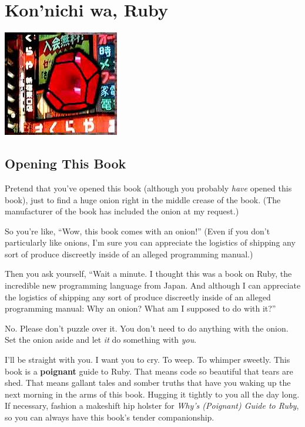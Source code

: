 \documentclass[10pt,twoside]{report}
\begin{document}
\newpage
\thispagestyle{empty}
\mbox{}
\cleartooddpage


\chapter{Kon'nichi wa, Ruby}
\vfill
\begin{center}
  \includegraphics{cache/chapterpoignantguide2.png}
\end{center}
\vspace{2cm}
\newpage
\thispagestyle{empty}
\mbox{}
\clearpage

\section{Opening This Book}

Pretend that you've opened this book (although you probably {\em have}
opened this book), just to find a huge onion right in the middle
crease of the book.  (The manufacturer of the book has included the
onion at my request.)

So you're like, ``Wow, this book comes with an onion!''  (Even if you
don't particularly like onions, I'm sure you can appreciate the
logistics of shipping any sort of produce discreetly inside of an
alleged programming manual.)

Then you ask yourself, ``Wait a minute.  I thought this was a book on
Ruby, the incredible new programming language from Japan.  And
although I can appreciate the logistics of shipping any sort of
produce discreetly inside of an alleged programming manual: Why an
onion? What am I supposed to do with it?''

No.  Please don't puzzle over it.  You don't need to do anything with
the onion.  Set the onion aside and let {\em it} do something with
{\em you}.

I'll be straight with you.  I want you to cry.  To weep.  To whimper
sweetly.  This book is a {\bf poignant} guide to Ruby.  That means
code so beautiful that tears are shed.  That means gallant tales and
somber truths that have you waking up the next morning in the arms of
this book.  Hugging it tightly to you all the day long. If necessary,
fashion a makeshift hip holster for {\em Why's (Poignant) Guide to
  Ruby}, so you can always have this book's tender companionship.
\end{document}
